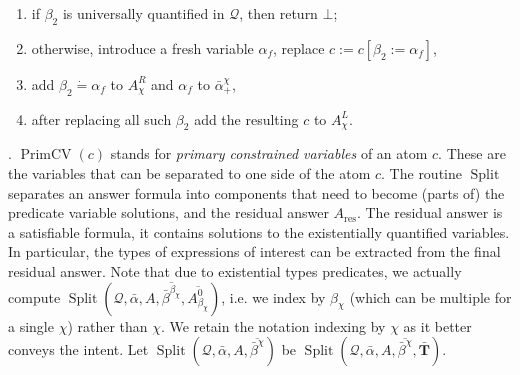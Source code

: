 \documentclass{article}
\newcommand{\assign}{:=}
\newcommand{\tmem}[1]{{\em #1\/}}
\newcommand{\tmmathbf}[1]{\ensuremath{\boldsymbol{#1}}}
\newcommand{\tmop}[1]{\ensuremath{\operatorname{#1}}}
\begin{document}
\begin{table}[t]
\begin{enumerate}
    \item if $\beta_2$ is universally quantified in $\mathcal{Q}$, then return
    $\bot$;
    
    \item otherwise, introduce a fresh variable $\alpha_f$, replace $c \assign
    c [\beta_2 \assign \alpha_f]$,
    
    \item add $\beta_2 \dot{=} \alpha_f$ to $A^R_{\chi}$ and $\alpha_f$ to
    $\bar{\alpha}_+^{\chi}$,
    
    \item after replacing all such $\beta_2$ add the resulting $c$ to
    $A_{\chi}^L$.
  \end{enumerate}
  
  \caption{Split routine $\tmop{Split} (\mathcal{Q}, \bar{\alpha}, A,
  \overline{\bar{\beta}^{\chi}}, \overline{A_{\chi}})$}
\end{table}. $\tmop{PrimCV} (c)$ stands for {\tmem{primary constrained
variables}} of an atom $c$. These are the variables that can be separated to
one side of the atom $c$. The routine $\tmop{Split}$ separates an answer
formula into components that need to become (parts of) the predicate variable
solutions, and the residual answer $A_{\tmop{res}}$. The residual answer is a
satisfiable formula, it contains solutions to the existentially quantified
variables. In particular, the types of expressions of interest can be
extracted from the final residual answer. Note that due to existential types
predicates, we actually compute $\tmop{Split} \left( \mathcal{Q},
\bar{\alpha}, A, \overline{\bar{\beta}^{\beta_{\chi}}},
\overline{A_{\beta_{\chi}}^0} \right)$, i.e. we index by $\beta_{\chi}$ (which
can be multiple for a single $\chi$) rather than $\chi$. We retain the
notation indexing by $\chi$ as it better conveys the intent. Let $\tmop{Split}
(\mathcal{Q}, \bar{\alpha}, A, \overline{\bar{\beta}^{\chi}})$ be
$\tmop{Split} (\mathcal{Q}, \bar{\alpha}, A, \overline{\bar{\beta}^{\chi}},
\bar{\tmmathbf{T}})$.
\end{document}
